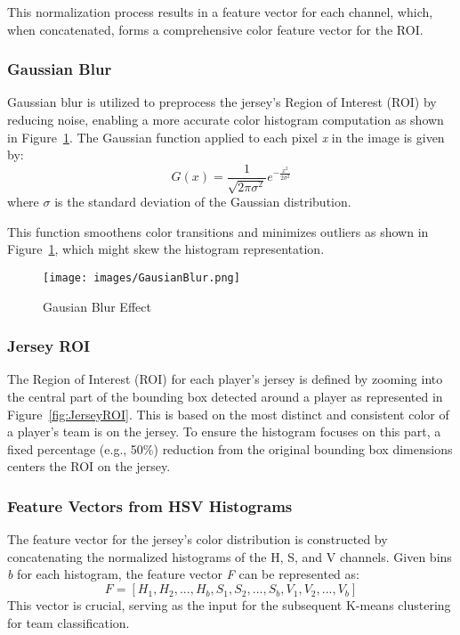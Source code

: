 \documentclass[12pt, letterpaper]{article}
\begin{document}
{\begin{spacing}{1.2}
This normalization process results in a feature vector for each channel, which, when concatenated, forms a comprehensive color feature vector for the ROI.

\subsubsection{Gaussian Blur}

Gaussian blur is utilized to preprocess the jersey's Region of Interest (ROI) by reducing noise, enabling a more accurate color histogram computation as shown in Figure~\ref{fig:GausianBlur}. The Gaussian function applied to each pixel \textit{x} in the image is given by:
\[ G(x) = \frac{1}{\sqrt{2\pi\sigma^2}}e^{-\frac{x^2}{2\sigma^2}} \]
where \(\sigma\) is the standard deviation of the Gaussian distribution. 

This function smoothens color transitions and minimizes outliers as shown in Figure~\ref{fig:GausianBlur}, which might skew the histogram representation.

\begin{figure}[htbp]
\centering
\texttt{[image: images/GausianBlur.png]}
\captionsetup{font=large}
\caption{Gausian Blur Effect}
\label{fig:GausianBlur}
\end{figure}

\subsubsection{Jersey ROI}

The Region of Interest (ROI) for each player's jersey is defined by zooming into the central part of the bounding box detected around a player as represented in Figure~\ref{fig:JerseyROI}. This is based on the most distinct and consistent color of a player’s team is on the jersey. To ensure the histogram focuses on this part, a fixed percentage (e.g., 50\%) reduction from the original bounding box dimensions centers the ROI on the jersey.

\subsubsection{Feature Vectors from HSV Histograms}

The feature vector for the jersey's color distribution is constructed by concatenating the normalized histograms of the H, S, and V channels. Given bins \textit{b} for each histogram, the feature vector \textit{F} can be represented as:
\[ F = [H_1, H_2, ..., H_b, S_1, S_2, ..., S_b, V_1, V_2, ..., V_b] \]
This vector is crucial, serving as the input for the subsequent K-means clustering for team classification.


\end{spacing}}
\end{document}
